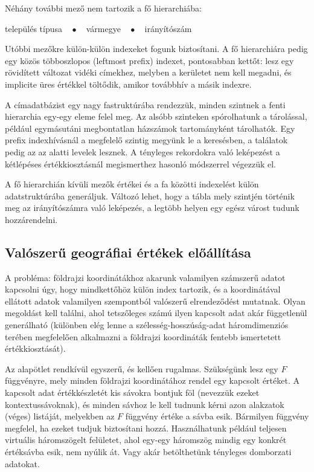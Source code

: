 \documentclass[
    parspace,
    noindent,
    nohyp,
]{elteiktdk}[2023/04/10]
\begin{document}
Néhány további mező nem tartozik a fő hierarchiába:

\begin{center}
    település típusa ~ $\bullet$ ~
    vármegye ~ $\bullet$ ~
    irányítószám
\end{center}

Utóbbi mezőkre külön-külön indexeket fogunk biztosítani.
A fő hierarchiára pedig egy közös többoszlopos (leftmost prefix) indexet,
pontosabban kettőt:
lesz egy rövidített változat vidéki címekhez, melyben a kerületet nem kell megadni,
és implicite üres értékkel töltődik, amikor továbbhív a másik indexre.

A címadatbázist egy nagy fastruktúrába rendezzük,
minden szintnek a fenti hierarchia egy-egy eleme felel meg.
Az alsóbb szinteken spórolhatunk a tárolással,
például egymásutáni megbontatlan házszámok tartományként tárolhatók.
Egy prefix indexhívásnál a megfelelő szintig megyünk le a keresésben,
a találatok pedig az az alatti levelek lesznek.
A tényleges rekordokra való leképezést
a kétlépéses értékkiosztásnál megismerthez hasonló módszerrel végezzük el.

A fő hierarchián kívüli mezők értékei és a fa közötti indexelést külön adatstruktúrába generáljuk.
Változó lehet, hogy a tábla mely szintjén történik meg az irányítószámra való leképezés,
a legtöbb helyen egy egész várost tudunk hozzárendelni.

\subsection{Valószerű geográfiai értékek előállítása}

A probléma: földrajzi koordinátákhoz akarunk valamilyen számszerű adatot kapcsolni úgy,
hogy mindkettőhöz külön index tartozik,
és a koordinátával ellátott adatok valamilyen szempontból valószerű elrendeződést mutatnak.
Olyan megoldást kell találni, ahol tetszőleges számú ilyen kapcsolt adat akár függetlenül generálható
(különben elég lenne a szélesség-hosszúság-adat háromdimenziós terében megfelelően alkalmazni
a földrajzi koordináták fentebb ismertetett értékkiosztását).

Az alapötlet rendkívül egyszerű, és kellően rugalmas.
Szükségünk lesz egy $F$ függvényre, mely minden földrajzi koordinátához rendel egy kapcsolt értéket.
A kapcsolt adat értékkészletét kis sávokra bontjuk föl (nevezzük ezeket kontextussávoknak),
és minden sávhoz le kell tudnunk kérni azon alakzatok (véges) listáját,
melyekben az $F$ függvény értéke a sávba esik.
Bármilyen függvény megfelel, ha ezeket tudjuk biztosítani hozzá.
Használhatunk például teljesen virtuális háromszögelt felületet,
ahol egy-egy háromszög mindig egy konkrét értéksávba esik, nem nyúlik át.
Vagy akár betölthetünk tényleges domborzati adatokat.
\end{document}
